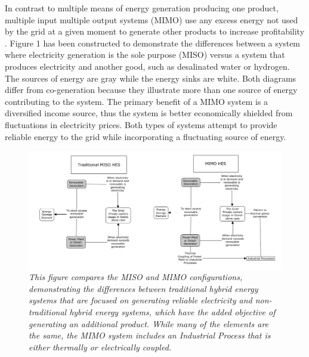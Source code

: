 \documentclass[12pt]{UIdahoMastersThesis}
\begin{document}
In contrast to multiple means of energy generation producing one product, multiple input multiple output systems (MIMO) use any excess energy not used by the grid at a given moment to generate other products to increase profitability \cite {Garcia2013}. Figure 1 has been constructed to demonstrate the differences between a system where electricity generation is the sole purpose (MISO) versus a system that produces electricity and another good, such as desalinated water or hydrogen. The sources of energy are gray while the energy sinks are white. Both diagrams differ from co-generation because they illustrate more than one source of energy contributing to the system. The primary benefit of a MIMO system is a diversified income source, thus the system is better economically shielded from fluctuations in electricity prices. Both types of systems attempt to provide reliable energy to the grid while incorporating a fluctuating source of energy.

\begin{figure}
\includegraphics[width=\textwidth]{MISO_MIMO.png}
\caption{\small \sl This figure compares the MISO and MIMO configurations, demonstrating the differences between traditional hybrid energy systems that are focused on generating reliable electricity and non-traditional hybrid energy systems, which have the added objective of generating an additional product.  While many of the elements are the same, the MIMO system includes an Industrial Process  that is either thermally or electrically coupled.}
\end{figure}
\end{document}
